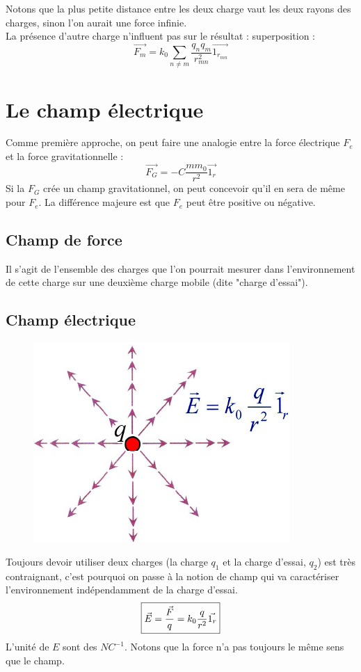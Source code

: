 \documentclass	[11pt, a4paper, openany]{book}
\begin{document}
Notons que la plus petite distance entre les deux charge vaut les deux rayons des charges, sinon l'on aurait une force infinie.\\
La présence d'autre charge n'influent pas sur le résultat :  superposition :
\begin{equation}
	\vec{F_m} = k_0\sum_{n\neq m} \frac{q_nq_m}{r^2_{mn}}\vec{1_{r_{mn}}}
\end{equation}

\section{Le champ électrique}
Comme première approche, on peut faire une analogie entre la force électrique $F_e$ et la force gravitationnelle :
\begin{equation}
	\vec{F_G} = -C \frac{mm_0}{r^2}\vec{1_r}
\end{equation}
Si la $F_G$ crée un champ gravitationnel, on peut concevoir qu'il en sera de même pour $F_e$. La différence majeure est que $F_e$ peut être positive ou négative.

\subsection{Champ de force}
Il s'agit de l'ensemble des charges que l'on pourrait mesurer dans l'environnement de cette charge sur une deuxième charge mobile (dite "charge d'essai").

\subsection{Champ électrique}
\begin{figure}
	\includegraphics[scale=0.34]{es/image3.png}
\end{figure}
Toujours devoir utiliser deux charges (la charge $q_1$ et la charge d'essai, $q_2$) est très contraignant, c'est pourquoi on passe à la notion de champ qui va caractériser l'environnement indépendamment de la charge d'essai.
\begin{equation}
	\fbox{$\vec{E} = \dfrac{\vec{F}}{q} = k_0\dfrac{q}{r^2}\vec{1_r}$}
\end{equation}
L'unité de $E$ sont des $NC^{-1}$. Notons que la force n'a pas toujours le même sens que le champ.
\end{document}
